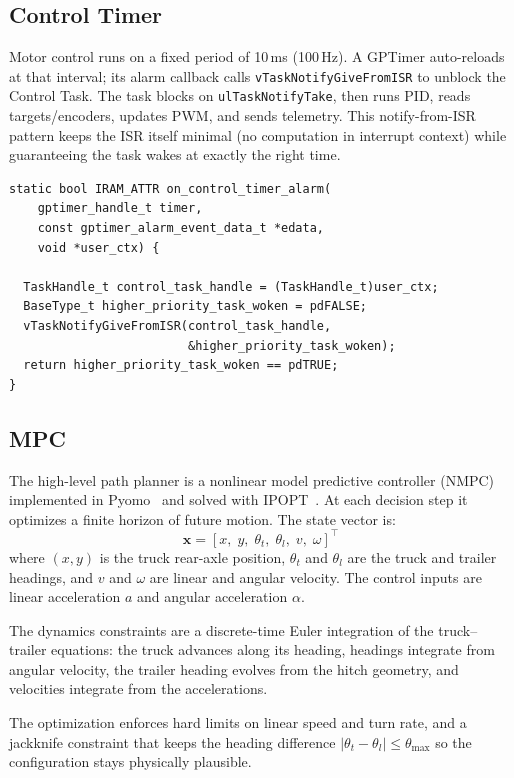 \documentclass[11pt, letterpaper]{article}
\begin{document}
\subsection{Control Timer}

Motor control runs on a fixed period of 10\,ms (100\,Hz). A GPTimer
auto-reloads at that interval; its alarm callback calls
\texttt{vTaskNotifyGiveFromISR} to unblock the Control Task. The task
blocks on \texttt{ulTaskNotifyTake}, then runs PID, reads
targets/encoders, updates PWM, and sends telemetry. This
notify-from-ISR pattern keeps the ISR itself minimal (no computation in
interrupt context) while guaranteeing the task wakes at exactly the
right time.

\begin{lstlisting}[style=clang]
static bool IRAM_ATTR on_control_timer_alarm(
    gptimer_handle_t timer,
    const gptimer_alarm_event_data_t *edata,
    void *user_ctx) {

  TaskHandle_t control_task_handle = (TaskHandle_t)user_ctx;
  BaseType_t higher_priority_task_woken = pdFALSE;
  vTaskNotifyGiveFromISR(control_task_handle,
                         &higher_priority_task_woken);
  return higher_priority_task_woken == pdTRUE;
}
\end{lstlisting}

\subsection{MPC}

The high-level path planner is a nonlinear model predictive controller
(NMPC) implemented in Pyomo~\cite{pyomo} and solved with
IPOPT~\cite{ipopt}. At each decision step it optimizes a finite horizon
of future motion. The state vector is:
\[
  \mathbf{x} = [x,\; y,\; \theta_t,\; \theta_l,\; v,\; \omega]^\top
\]
where $(x,y)$ is the truck rear-axle position, $\theta_t$ and
$\theta_l$ are the truck and trailer headings, and $v$ and $\omega$ are
linear and angular velocity. The control inputs are linear acceleration
$a$ and angular acceleration $\alpha$.

The dynamics constraints are a discrete-time Euler integration of the
truck--trailer equations: the truck advances along its heading, headings
integrate from angular velocity, the trailer heading evolves from the
hitch geometry, and velocities integrate from the accelerations.

The optimization enforces hard limits on linear speed and turn rate, and
a jackknife constraint that keeps the heading difference
$|\theta_t - \theta_l| \leq \theta_{\max}$ so the configuration stays
physically plausible.
\end{document}
